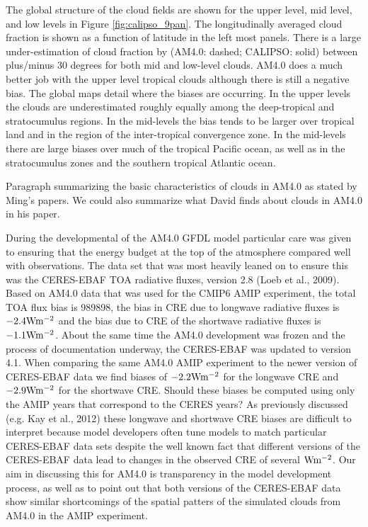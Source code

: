 \documentclass[11pt]{article}   	%
\begin{document}
The global structure of the cloud fields are shown for the upper level, mid level, and low levels in 
Figure \ref{fig:calipso_9pan}.  The longitudinally averaged cloud fraction is shown as a function of latitude in the 
left most panels.  There is a large under-estimation of cloud fraction by (AM4.0: dashed; CALIPSO: solid) between 
plus/minus 30 
degrees for both mid and low-level clouds.   AM4.0 does a much better job with the upper level tropical clouds 
although there is still a negative bias.   The global maps detail where the biases are occurring.  In the upper 
levels the clouds are underestimated roughly equally among the deep-tropical and stratocumulus regions.  In the
mid-levels the bias tends to be larger over tropical land and in the region of the inter-tropical convergence zone.  
In the mid-levels there are large biases over much of the tropical Pacific ocean, as well as in the stratocumulus
zones and the southern tropical Atlantic ocean.  

Paragraph summarizing the basic characteristics of clouds in AM4.0 as stated by Ming's papers.  We could also summarize 
what David finds about clouds in AM4.0 in his paper.

During the developmental of the AM4.0 GFDL model particular care was given to ensuring that the energy budget at 
the top of the atmosphere compared well with observations.  The data set that was most heavily leaned on to ensure 
this was the CERES-EBAF TOA radiative fluxes, version 2.8 (Loeb et al., 2009).  Based on AM4.0 data that was used for 
the CMIP6 AMIP
experiment, the total TOA flux bias is 989898, the bias in CRE 
due to longwave radiative fluxes is $-2.4 \rm{W m^{-2}} $ and the bias due to CRE of the shortwave radiative fluxes   
is $-1.1 \rm{W m^{-2}} $.  About the same time the AM4.0 development was frozen and the process of documentation 
underway, the CERES-EBAF was updated to version 4.1.  When comparing the same AM4.0 AMIP experiment to the 
newer version of CERES-EBAF data we find biases of $-2.2 \rm{W m^{-2}} $ for the longwave CRE and 
$-2.9 \rm{W m^{-2}} $ for the shortwave CRE.   Should these biases be computed using only the AMIP years that 
correspond to the CERES years?   As previously discussed (e.g. Kay et al., 2012) these longwave and shortwave CRE 
biases are difficult to interpret because model developers often tune models to match particular CERES-EBAF data 
sets despite the well known fact that different versions of the CERES-EBAF data lead to changes in the observed CRE of
several $\rm{W m^{-2}}$.   Our aim in discussing this for AM4.0 is transparency in the model development process, as 
well as to point out that both versions of the CERES-EBAF data show similar shortcomings of the spatial patters of the 
simulated clouds  from AM4.0 in the AMIP experiment.   
\end{document}
